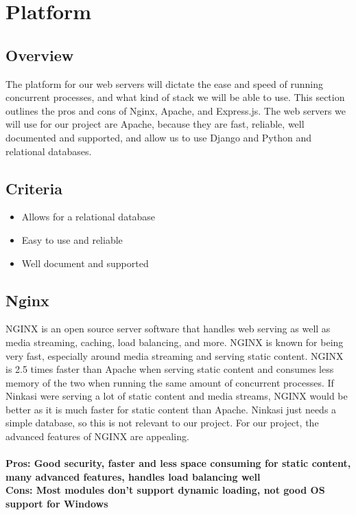 \documentclass[draftclsnofoot,onecolumn,letterpaper,10pt,compsoc]{IEEEtran}
\begin{document}
		\section{Platform}
		\subsection{Overview}
		The platform for our web servers will dictate the ease and speed of running concurrent processes, and what kind of stack we will be able to use.
		This section outlines the pros and cons of Nginx, Apache, and Express.js.
		The web servers we will use for our project are Apache, because they are fast, reliable, well documented and supported, and allow us to use Django and Python and relational databases.
		\subsection{Criteria}
		\begin{itemize}
		\item Allows for a relational database
		\item Easy to use and reliable
		\item Well document and supported
		\end{itemize}

			\subsection{Nginx}
				NGINX is an open source server software that handles web serving as well as media streaming, caching, load balancing, and more\cite{NGINX}.
				NGINX is known for being very fast, especially around media streaming and serving static content\cite{NGINX}.
				NGINX is 2.5 times faster than Apache when serving static content and consumes less memory of the two when running the same amount of concurrent processes\cite{HostingAd}.
				If Ninkasi were serving a lot of static content and media streams, NGINX would be better as it is much faster for static content than Apache.
				Ninkasi just needs a simple database, so this is not relevant to our project.
				For our project, the advanced features of NGINX are appealing.
				\\ \\
				\textbf{Pros: Good security, faster and less space consuming for static content, many advanced features, handles load balancing well}
				\\
				\textbf{Cons: Most modules don't support dynamic loading, not good OS support for Windows}
\end{document}
